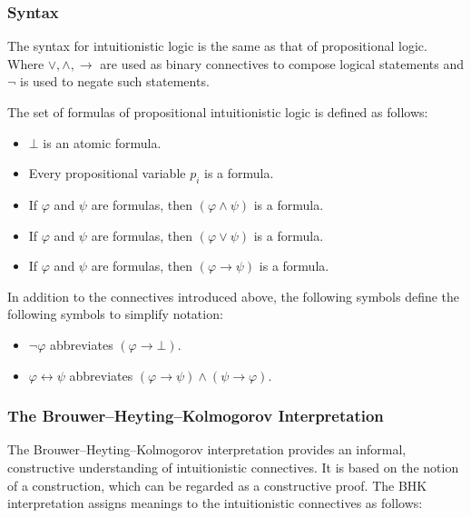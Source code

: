 \subsubsection{\centering Syntax}
The syntax for intuitionistic logic is the same as that of propositional logic. Where $\lor, \land, \to$ are used as binary connectives to compose logical statements and $\lnot$ is used to negate such statements.

\begin{definition}
The set of formulas of propositional intuitionistic logic is defined as follows:
\begin{itemize}
    \item $\bot$ is an atomic formula.
    \item Every propositional variable $p_i$ is a formula.
    \item If $\varphi$ and $\psi$ are formulas, then $(\varphi \wedge \psi)$ is a formula.
    \item If $\varphi$ and $\psi$ are formulas, then $(\varphi \vee \psi)$ is a formula.
    \item If $\varphi$ and $\psi$ are formulas, then $(\varphi \to \psi)$ is a formula.
\end{itemize}

\medskip
In addition to the connectives introduced above, the following symbols define the following symbols to simplify notation:
\begin{itemize}
    \item $\lnot \varphi$ abbreviates $(\varphi \to \bot)$.
    \item $\varphi \leftrightarrow \psi$ abbreviates $(\varphi \to \psi) \wedge (\psi \to \varphi)$.
\end{itemize}
\end{definition}

\subsubsection{\centering The Brouwer--Heyting--Kolmogorov Interpretation}

The Brouwer--Heyting--Kolmogorov interpretation provides an informal, constructive understanding of intuitionistic connectives. It is based on the notion of a construction, which can be regarded as a constructive proof. The BHK interpretation assigns meanings to the intuitionistic connectives as
follows:

